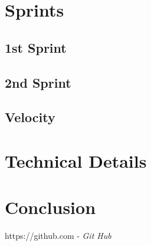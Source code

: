 \documentclass[a4paper,10pt]{report}
\begin{document}
\chapter{Sprints}
\section{1st Sprint}
\section{2nd Sprint}
\section{Velocity}
\chapter{Technical Details}
\chapter{Conclusion}

\newpage
\begin{thebibliography}{}
\bibitem{} https://github.com - \emph{Git Hub}

\end{thebibliography}
\end{document}
